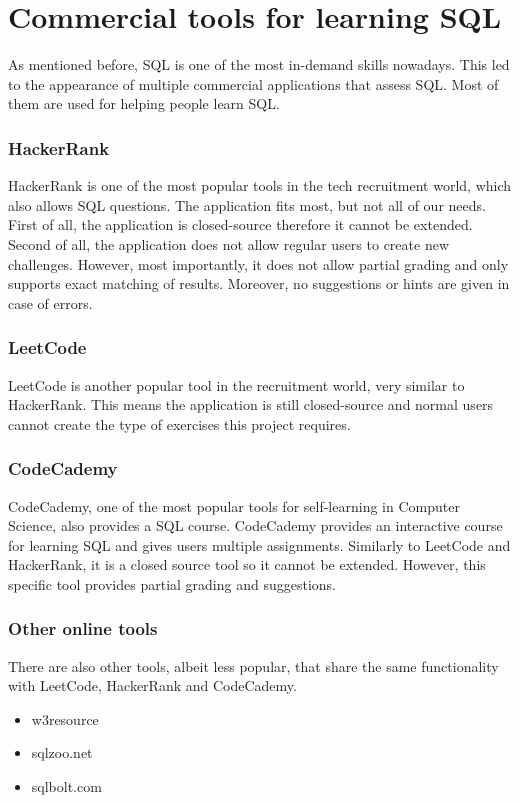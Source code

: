 \section{Commercial tools for learning SQL} \label{ch:lit:sec:tutor:comercial}

As mentioned before, SQL is one of the most in-demand skills
nowadays. This led to the appearance of multiple commercial 
applications that assess SQL. Most of them are used for helping people
learn SQL.

\subsubsection{HackerRank}
HackerRank is one of the most popular tools in the tech recruitment world,
which also allows SQL questions. The application fits most, but not all of our
needs. First of all, the application is closed-source therefore it cannot be extended. Second of all, the application does not allow regular
users to create new challenges. However, most importantly, it does not allow partial grading and only supports exact matching
of results. Moreover, no suggestions or hints are given in case of errors.

\subsubsection{LeetCode}
LeetCode is another popular tool in the recruitment world, very similar to
HackerRank. This means the application is still closed-source and
normal users cannot create the type of exercises this project requires.

\subsubsection{CodeCademy}
CodeCademy, one of the most popular tools for self-learning in Computer
Science, also provides a SQL course. CodeCademy provides an interactive
course for learning SQL and gives users multiple assignments.
Similarly to LeetCode and HackerRank, it is a closed source tool so it cannot be
extended. However, this specific tool provides partial grading and suggestions.

\subsubsection{Other online tools}
There are also other tools, albeit less popular, that share the same functionality with LeetCode, HackerRank and CodeCademy.
\begin{itemize}
    \item w3resource
    \item sqlzoo.net
    \item sqlbolt.com
\end{itemize}

